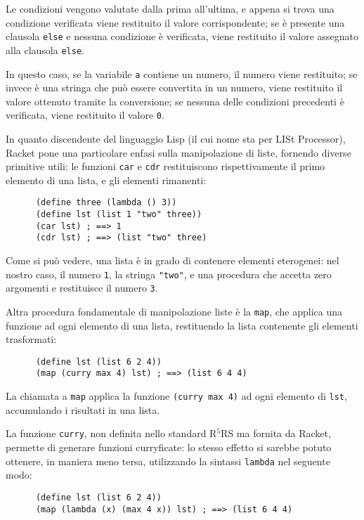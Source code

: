 Le condizioni vengono valutate dalla prima all'ultima, e appena si
trova una condizione verificata viene restituito il valore
corrispondente; se \`e presente una clausola \lstinline{else} e
nessuna condizione \`e verificata, viene restituito il valore
assegnato alla clausola \lstinline{else}.

In questo caso, se la variabile \lstinline{a} contiene un numero, il
numero viene restituito; se invece \`e una stringa che pu\`o essere
convertita in un numero, viene restituito il valore ottenuto tramite
la conversione; se nessuna delle condizioni precedenti \`e verificata,
viene restituito il valore \lstinline{0}.

In quanto discendente del linguaggio Lisp (il cui nome sta per LISt
Processor), Racket pone una particolare enfasi sulla manipolazione di
liste, fornendo diverse primitive utili: le funzioni \lstinline{car} e
\lstinline{cdr} restituiscono rispettivamente il primo elemento di una
lista, e gli elementi rimanenti:

\begin{lstlisting}
      (define three (lambda () 3))
      (define lst (list 1 "two" three))
      (car lst) ; ==> 1
      (cdr lst) ; ==> (list "two" three)
\end{lstlisting}

Come si pu\`o vedere, una lista \`e in grado di contenere elementi
eterogenei: nel nostro caso, il numero \lstinline{1}, la stringa
\lstinline{"two"}, e una procedura che accetta zero argomenti e restituisce
il numero \lstinline{3}.

Altra procedura fondamentale di manipolazione liste \`e la \lstinline{map},
che applica una funzione ad ogni elemento di una lista, restituendo la
lista contenente gli elementi trasformati:

\begin{lstlisting}
      (define lst (list 6 2 4))
      (map (curry max 4) lst) ; ==> (list 6 4 4)
\end{lstlisting}

La chiamata a \lstinline{map} applica la funzione \lstinline{(curry max 4)}
ad ogni elemento di \lstinline{lst}, accumulando i risultati in una lista.

La funzione \lstinline{curry}, non definita nello standard R$^{5}$RS ma
fornita da Racket, permette di generare funzioni curryficate: lo stesso
effetto si sarebbe potuto ottenere, in maniera meno tersa, utilizzando la
sintassi \lstinline{lambda} nel seguente modo:

\begin{lstlisting}
      (define lst (list 6 2 4))
      (map (lambda (x) (max 4 x)) lst) ; ==> (list 6 4 4)
\end{lstlisting}

